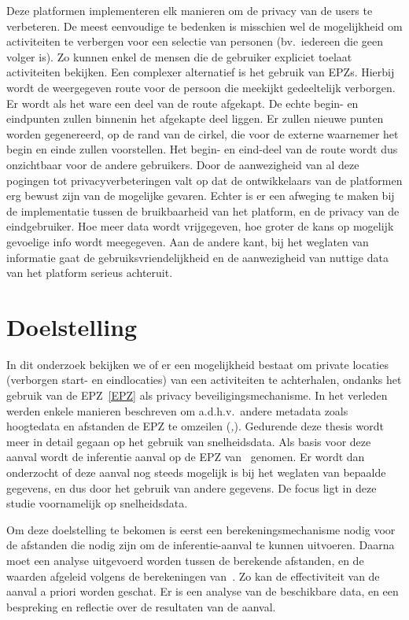 Deze platformen implementeren elk manieren om de privacy van de users te
verbeteren. De meest eenvoudige te bedenken is misschien wel de mogelijkheid om
activiteiten te verbergen voor een selectie van personen (bv.\ iedereen die
geen volger is). Zo kunnen enkel de mensen die de gebruiker expliciet toelaat
activiteiten bekijken. Een complexer alternatief is het gebruik van \acp{EPZ}.
Hierbij wordt de weergegeven route voor de persoon die meekijkt gedeeltelijk
verborgen. Er wordt als het ware een deel van de route afgekapt. De echte
begin- en eindpunten zullen binnenin het afgekapte deel liggen. Er zullen
nieuwe punten worden gegenereerd, op de rand van de cirkel, die voor de externe
waarnemer het begin en einde zullen voorstellen. Het begin- en eind-deel van de
route wordt dus onzichtbaar voor de andere gebruikers. Door de aanwezigheid van
al deze pogingen tot privacyverbeteringen valt op dat de ontwikkelaars van de
platformen erg bewust zijn van de mogelijke gevaren. Echter is er een afweging
te maken bij de implementatie tussen de bruikbaarheid van het platform, en de
privacy van de eindgebruiker. Hoe meer data wordt vrijgegeven, hoe groter de
kans op mogelijk gevoelige info wordt meegegeven. Aan de andere kant, bij het
weglaten van informatie gaat de gebruiksvriendelijkheid en de aanwezigheid van
nuttige data van het platform serieus achteruit.

\section{Doelstelling}
In dit onderzoek bekijken we of er een mogelijkheid bestaat om private locaties
(verborgen start- en eindlocaties) van een activiteiten te achterhalen, ondanks
het gebruik van de \ac{EPZ}~\ref{EPZ} als privacy beveiligingsmechanisme. In
het verleden werden enkele manieren beschreven om a.d.h.v.\ andere metadata
zoals hoogtedata en afstanden de \ac{EPZ} te omzeilen
(\textit{\cite{Dhondt_Pochat_Voulimeneas_Joosen_Volckaert_2022},\cite{Verdonck_2022}}).
Gedurende deze thesis wordt meer in detail gegaan op het gebruik van
snelheidsdata. Als basis voor deze aanval wordt de inferentie aanval op de EPZ
van~\citeauthor{Dhondt_Pochat_Voulimeneas_Joosen_Volckaert_2022} genomen. Er
wordt dan onderzocht of deze aanval nog steeds mogelijk is bij het weglaten van
bepaalde gegevens, en dus door het gebruik van andere gegevens. De focus ligt
in deze studie voornamelijk op snelheidsdata.

Om deze doelstelling te bekomen is eerst een berekeningsmechanisme nodig voor
de afstanden die nodig zijn om de inferentie-aanval te kunnen uitvoeren. Daarna
moet een analyse uitgevoerd worden tussen de berekende afstanden, en de waarden
afgeleid volgens de berekeningen
van~\citeauthor{Dhondt_Pochat_Voulimeneas_Joosen_Volckaert_2022}. Zo kan de
effectiviteit van de aanval a priori worden geschat. Er is een analyse van de
beschikbare data, en een bespreking en reflectie over de resultaten van de
aanval.